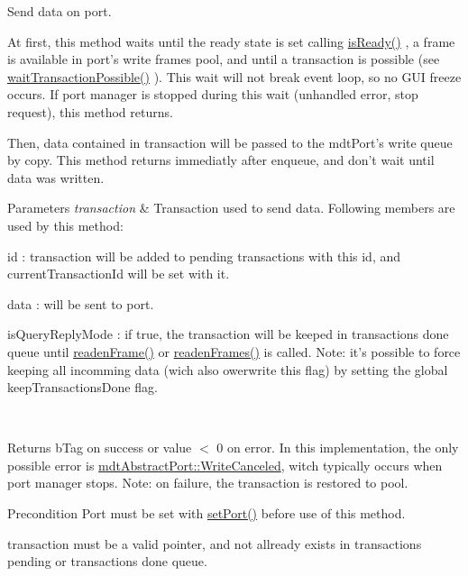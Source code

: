 Send data on port. 

At first, this method waits until the ready state is set calling \hyperlink{classmdt_usbtmc_port_manager_a0b90ceb0bbf424222ec878a355d206d7}{isReady()} , a frame is available in port's write frames pool, and until a transaction is possible (see \hyperlink{classmdt_port_manager_ac04a12f8aa20ba04695083afce45a6cc}{waitTransactionPossible()} ). This wait will not break event loop, so no GUI freeze occurs. If port manager is stopped during this wait (unhandled error, stop request), this method returns.

Then, data contained in transaction will be passed to the mdtPort's write queue by copy. This method returns immediatly after enqueue, and don't wait until data was written.


\begin{DoxyParams}{Parameters}
{\em transaction} & Transaction used to send data. Following members are used by this method:
\begin{DoxyItemize}
\item id : transaction will be added to pending transactions with this id, and currentTransactionId will be set with it.
\item data : will be sent to port.
\item isQueryReplyMode : if true, the transaction will be keeped in transactions done queue until \hyperlink{classmdt_port_manager_a830ae182d06dd6a52c43a7f45b9240ac}{readenFrame()} or \hyperlink{classmdt_port_manager_addd5dcae9644cea42a9871205af41796}{readenFrames()} is called. Note: it's possible to force keeping all incomming data (wich also owerwrite this flag) by setting the global keepTransactionsDone flag.
\end{DoxyItemize}\\
\hline
\end{DoxyParams}
\begin{DoxyReturn}{Returns}
bTag on success or value $<$ 0 on error. In this implementation, the only possible error is \hyperlink{classmdt_abstract_port_ad4121bb930c95887e77f8bafa065a85eae50ff4a9393507ad39005ddc7d5be42f}{mdtAbstractPort::WriteCanceled}, witch typically occurs when port manager stops. Note: on failure, the transaction is restored to pool. 
\end{DoxyReturn}
\begin{DoxyPrecond}{Precondition}
Port must be set with \hyperlink{classmdt_port_manager_afcd156b2d0c9d340999935efb6cd8cb6}{setPort()} before use of this method. 

transaction must be a valid pointer, and not allready exists in transactions pending or transactions done queue. 
\end{DoxyPrecond}


